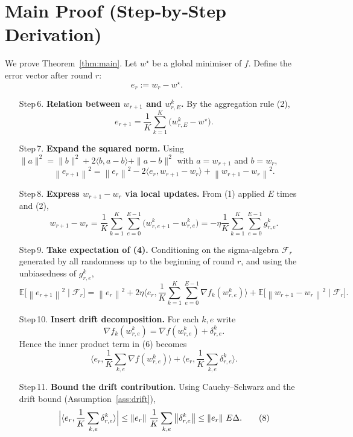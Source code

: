 \documentclass{article}
\newcommand{\EE}{\mathbb{E}}
\newcommand{\norm}[1]{\left\lVert#1\right\rVert}
\newcommand{\inner}[2]{\langle #1,#2\rangle}
\newcommand{\grad}{\nabla}
\begin{document}
\section*{Main Proof (Step‑by‑Step Derivation)}
We prove Theorem~\ref{thm:main}.  
Let $w^\star$ be a global minimiser of $f$.
Define the error vector after round $r$:
\[
    e_r := w_r - w^\star .
\]

\begin{enumerate}
\item[Step 6.] \textbf{Relation between $w_{r+1}$ and $w_{r,E}^{k}$.}
      By the aggregation rule (2),
      \[
      e_{r+1}= \frac1K\sum_{k=1}^{K}\bigl(w_{r,E}^{k}-w^\star\bigr).
      \]

\item[Step 7.] \textbf{Expand the squared norm.}
      Using $\|a\|^{2}= \|b\|^{2}+2\inner{b}{a-b}+\|a-b\|^{2}$ with
      $a=w_{r+1}$ and $b=w_r$,
      \[
      \norm{e_{r+1}}^{2}
      = \norm{e_{r}}^{2}
        -2\inner{e_r}{w_{r+1}-w_r}
        +\norm{w_{r+1}-w_r}^{2}. \tag{4}
      \]

\item[Step 8.] \textbf{Express $w_{r+1}-w_r$ via local updates.}
      From (1) applied $E$ times and (2),
      \[
      w_{r+1}-w_r
      =\frac1K\sum_{k=1}^{K}\sum_{e=0}^{E-1}
          \bigl(w_{r,e+1}^{k}-w_{r,e}^{k}\bigr)
      = -\eta\frac1K\sum_{k=1}^{K}\sum_{e=0}^{E-1} g_{r,e}^{k}. \tag{5}
      \]

\item[Step 9.] \textbf{Take expectation of (4).}
      Conditioning on the sigma‑algebra $\mathcal{F}_r$ generated by all
      randomness up to the beginning of round $r$,
      and using the unbiasedness of $g_{r,e}^{k}$,
      \[
      \EE\!\bigl[\norm{e_{r+1}}^{2}\mid\mathcal{F}_r\bigr]
      = \norm{e_{r}}^{2}
        +2\eta\inner{e_r}{
               \frac1K\sum_{k=1}^{K}\sum_{e=0}^{E-1}
               \grad f_k(w_{r,e}^{k})}
        +\EE\!\bigl[\norm{w_{r+1}-w_r}^{2}\mid\mathcal{F}_r\bigr].
      \tag{6}
      \]

\item[Step 10.] \textbf{Insert drift decomposition.}
      For each $k,e$ write
      \[
      \grad f_k(w_{r,e}^{k})
      =\grad f(w_{r,e}^{k})+\delta_{r,e}^{k}.
      \]
      Hence the inner product term in (6) becomes
      \[
      \inner{e_r}{\frac1K\sum_{k,e}\grad f(w_{r,e}^{k})}
      +\inner{e_r}{\frac1K\sum_{k,e}\delta_{r,e}^{k}}.
      \tag{7}
      \]

\item[Step 11.] \textbf{Bound the drift contribution.}
      Using Cauchy–Schwarz and the drift bound (Assumption~\ref{ass:drift}),
      \[
      \Bigl|\inner{e_r}{\frac1K\sum_{k,e}\delta_{r,e}^{k}}\Bigr|
      \le \norm{e_r}\,\frac{1}{K}\sum_{k,e}\norm{\delta_{r,e}^{k}}
      \le \norm{e_r}\,E\Delta .
      \tag{8}
      \]


\end{enumerate}
\end{document}
